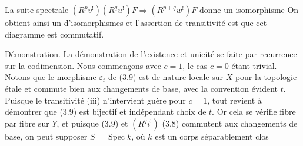 
La suite spectrale $(R^pv^!)(R^qu^!)F\Longrightarrow(R^{p+q}w^!)F$ donne un isomorphisme
On obtient ainsi un  d'isomorphismes
et l'assertion de transitivité est que cet diagramme est commutatif.

Démonstration. La démonstration de l'existence et unicité se faite par recurrence sur la codimension. Nous commençons avec $c=1$, le cas $c=0$ étant trivial. Notons que le morphisme $\varepsilon_t$ de (3.9) est de nature locale sur $X$ pour la topologie étale et commute bien aux changements de base, avec la convention évident  $t$. Puisque le transitivité (iii) n'intervient guère pour $c=1$, tout revient à démontrer que (3.9) est bijectif et indépendant  choix de $t$. Or cela se vérifie fibre par fibre sur $Y$, et puisque (3.9) et $(R^qi^!)$ (3.8) commutent aux changements de base, on peut supposer $S=\operatorname{Spec}k$, où $k$ est un corps séparablement clos
